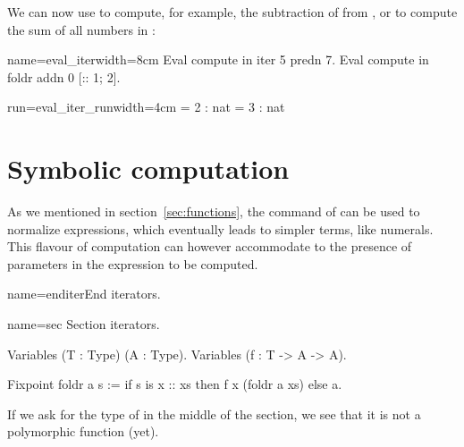 We can now use  to compute, for example,
the subtraction of  from , or 
to compute the
sum of all numbers in \C{[:: 1; 2]}:

\begin{coq}{name=eval_iter}{width=8cm}
Eval compute in iter 5 predn 7.
Eval compute in foldr addn 0 [:: 1; 2].
\end{coq}
\begin{coqout}{run=eval_iter_run}{width=4cm}
 = 2 : nat
 = 3 : nat
\end{coqout}


\section{Symbolic computation}\label{sec:symcomp}

As we mentioned in section~\ref{sec:functions}, the 
command of \Coq{} can be used to normalize expressions, which
eventually leads to simpler terms, like numerals. This flavour of
computation can however accommodate to the presence of parameters in
the expression to be computed.


\begin{coqdef}{name=enditer}End iterators.\end{coqdef}

\begin{coq}{name=sec}{}
Section iterators.

Variables (T : Type) (A : Type).
Variables (f : T -> A -> A).

Fixpoint foldr a s :=
  if s is x :: xs then f x (foldr a xs) else a.
\end{coq}

If we ask for the type of
 in the middle of the section, we see that
it is not a polymorphic function (yet).

